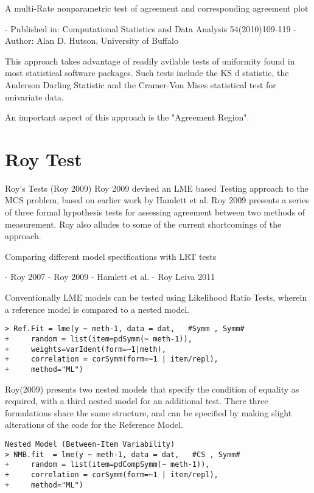 \documentclass[12pt, a4paper]{report}
\theoremstyle{plain}
\theoremstyle{definition}
\theoremstyle{remark}
\begin{document}
A multi-Rate nonparametric test of agreement and corresponding agreement plot

- Published in: Computational Statistics and Data Analysis 54(2010)109-119
- Author: Alan D. Hutson, University of Buffalo



This approach takes advantage of readily avilable tests of uniformity found in most statistical software packages.
Such tests include the KS d statistic, the Anderson Darling Statistic and the Cramer-Von Mises statistical test for univariate data.

An important aspect of this approach is the "Agreement Region".



\section*{Roy Test}

Roy’s Tests (Roy 2009)
Roy 2009 devised an LME based Testing approach to the MCS problem, based on earlier work by Hamlett et al. 
Roy 2009 presents a series of three formal hypothesis tests for assessing agreement between two methods of measurement.
Roy also alludes to some of the current shortcomings of the approach.


Comparing different model specifications with LRT tests

- Roy 2007
- Roy 2009
- Hamlett et al.
- Roy Leiva 2011



Conventionally LME models can be tested using Likelihood Ratio Tests, wherein a reference model is compared to a nested model.
\begin{verbatim}
> Ref.Fit = lme(y ~ meth-1, data = dat,   #Symm , Symm#
+     random = list(item=pdSymm(~ meth-1)), 
+     weights=varIdent(form=~1|meth),
+     correlation = corSymm(form=~1 | item/repl), 
+     method="ML")
\end{verbatim}
Roy(2009) presents two nested models that specify the condition of equality as required, with a third nested model for an additional test. There three formulations share the same structure, and can be specified by making slight alterations of the code for the Reference Model.
\begin{verbatim}
Nested Model (Between-Item Variability)
> NMB.fit  = lme(y ~ meth-1, data = dat,   #CS , Symm#
+     random = list(item=pdCompSymm(~ meth-1)),
+     correlation = corSymm(form=~1 | item/repl), 
+     method="ML")
\end{verbatim}
\end{document}

